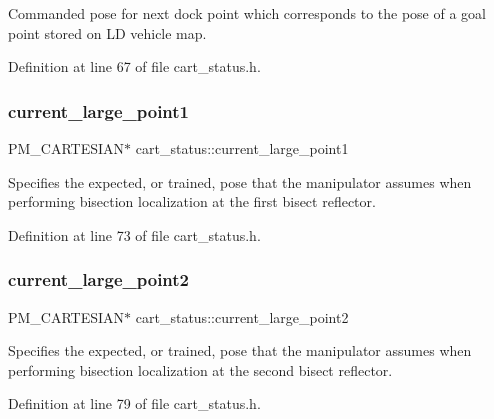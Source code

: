 Commanded pose for next dock point which corresponds to the pose of a goal point stored on LD vehicle map. 

Definition at line 67 of file cart\+\_\+status.\+h.

\mbox{\label{classcart__status_ab8c619198ba84c252a3740d2271f530e}} 
\subsubsection{\texorpdfstring{current\+\_\+large\+\_\+point1}{current\_large\_point1}}
{\footnotesize\ttfamily P\+M\+\_\+\+C\+A\+R\+T\+E\+S\+I\+AN$\ast$ cart\+\_\+status\+::current\+\_\+large\+\_\+point1\hspace{0.3cm}{\ttfamily [private]}}

Specifies the expected, or trained, pose that the manipulator assumes when performing bisection localization at the first bisect reflector. 

Definition at line 73 of file cart\+\_\+status.\+h.

\mbox{\label{classcart__status_ab17505f9587a0b7c6d3111a8a1d38080}} 
\subsubsection{\texorpdfstring{current\+\_\+large\+\_\+point2}{current\_large\_point2}}
{\footnotesize\ttfamily P\+M\+\_\+\+C\+A\+R\+T\+E\+S\+I\+AN$\ast$ cart\+\_\+status\+::current\+\_\+large\+\_\+point2\hspace{0.3cm}{\ttfamily [private]}}

Specifies the expected, or trained, pose that the manipulator assumes when performing bisection localization at the second bisect reflector. 

Definition at line 79 of file cart\+\_\+status.\+h.

\mbox{\label{classcart__status_ad458c08316b2199cbfbe0e1186585432}} 
